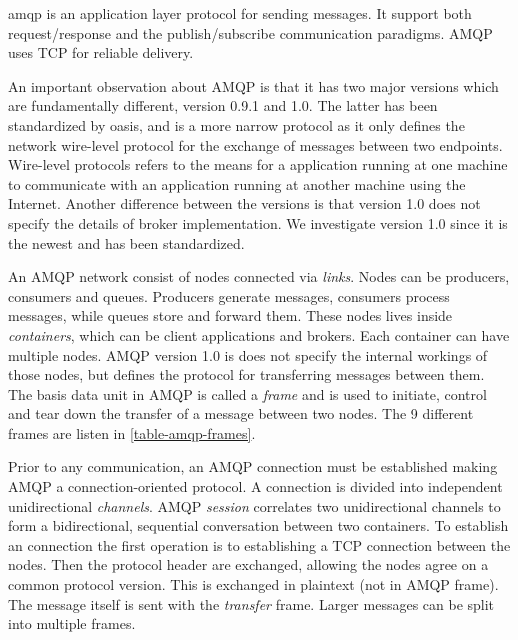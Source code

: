 \gls{amqp} is an application layer protocol for sending messages. It support
both request/response and the publish/subscribe communication paradigms. AMQP
uses TCP for reliable delivery.

 An important observation about AMQP is that it has two major versions which are
 fundamentally different, version 0.9.1 and 1.0. The latter has been
 standardized by \gls{oasis}\cite{oasis-amqp}, and is a  more narrow protocol as
 it only defines the network wire-level protocol for the exchange of messages
 between two endpoints. Wire-level protocols refers to the means for a
 application running at one machine to communicate with an application running
 at another machine using the Internet. Another difference between the versions
 is that version 1.0 does not specify the details of broker implementation. We
 investigate version 1.0 since it is the newest and has been standardized.

An AMQP network consist of nodes connected via \textit{links}. Nodes can be
producers, consumers and queues. Producers generate messages, consumers process
messages, while queues store and forward them. These nodes lives inside
\textit{containers}, which can be client applications and brokers. Each
container can have multiple nodes. AMQP version 1.0 is does not specify the
internal workings of those nodes, but defines the protocol for transferring
messages between them. The basis data unit in AMQP is called a \textit{frame}
and is used to initiate, control and tear down the transfer of a message between
two nodes. The 9 different frames are listen in \cref{table-amqp-frames}.

Prior to any communication, an AMQP connection must be established making AMQP a
connection-oriented protocol. A connection is divided into independent
unidirectional \textit{channels}. AMQP \textit{session} correlates two
unidirectional channels to form a bidirectional, sequential conversation between
two containers. To establish an connection the first operation is to
establishing a TCP connection between the nodes. Then the protocol header are
exchanged, allowing the nodes agree on a common protocol version. This is
exchanged in plaintext (not in AMQP frame). The message itself is sent with the
\textit{transfer} frame. Larger messages can be split into multiple frames.


